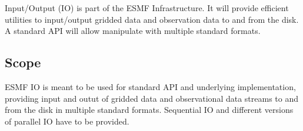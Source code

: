 Input/Output (IO) is part of the ESMF Infrastructure.  It will provide
efficient utilities to input/output gridded data and observation data
to and from the disk. A standard API will allow manipulate with multiple
standard formats.


\subsection{Scope}

ESMF IO is meant to be used for standard API and underlying
implementation, providing input and outut of gridded data and
observational data streams to and from the disk in multiple standard
formats. Sequential IO and different versions of parallel IO have to
be provided.  















